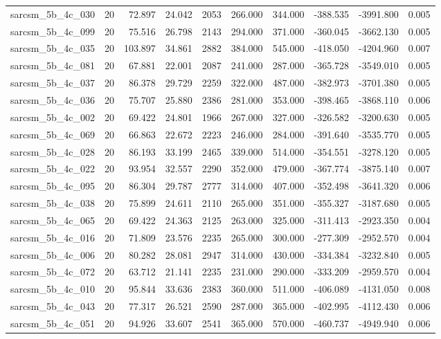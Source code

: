 \begin{tabular}{lrrrrrrrrr}
sarcsm\_5b\_4c\_030 & 20 & 72.897 & 24.042 & 2053 & 266.000 & 344.000 & -388.535 & -3991.800 & 0.005 \\
sarcsm\_5b\_4c\_099 & 20 & 75.516 & 26.798 & 2143 & 294.000 & 371.000 & -360.045 & -3662.130 & 0.005 \\
sarcsm\_5b\_4c\_035 & 20 & 103.897 & 34.861 & 2882 & 384.000 & 545.000 & -418.050 & -4204.960 & 0.007 \\
sarcsm\_5b\_4c\_081 & 20 & 67.881 & 22.001 & 2087 & 241.000 & 287.000 & -365.728 & -3549.010 & 0.005 \\
sarcsm\_5b\_4c\_037 & 20 & 86.378 & 29.729 & 2259 & 322.000 & 487.000 & -382.973 & -3701.380 & 0.005 \\
sarcsm\_5b\_4c\_036 & 20 & 75.707 & 25.880 & 2386 & 281.000 & 353.000 & -398.465 & -3868.110 & 0.006 \\
sarcsm\_5b\_4c\_002 & 20 & 69.422 & 24.801 & 1966 & 267.000 & 327.000 & -326.582 & -3200.630 & 0.005 \\
sarcsm\_5b\_4c\_069 & 20 & 66.863 & 22.672 & 2223 & 246.000 & 284.000 & -391.640 & -3535.770 & 0.005 \\
sarcsm\_5b\_4c\_028 & 20 & 86.193 & 33.199 & 2465 & 339.000 & 514.000 & -354.551 & -3278.120 & 0.005 \\
sarcsm\_5b\_4c\_022 & 20 & 93.954 & 32.557 & 2290 & 352.000 & 479.000 & -367.774 & -3875.140 & 0.007 \\
sarcsm\_5b\_4c\_095 & 20 & 86.304 & 29.787 & 2777 & 314.000 & 407.000 & -352.498 & -3641.320 & 0.006 \\
sarcsm\_5b\_4c\_038 & 20 & 75.899 & 24.611 & 2110 & 265.000 & 351.000 & -355.327 & -3187.680 & 0.005 \\
sarcsm\_5b\_4c\_065 & 20 & 69.422 & 24.363 & 2125 & 263.000 & 325.000 & -311.413 & -2923.350 & 0.004 \\
sarcsm\_5b\_4c\_016 & 20 & 71.809 & 23.576 & 2235 & 265.000 & 300.000 & -277.309 & -2952.570 & 0.004 \\
sarcsm\_5b\_4c\_006 & 20 & 80.282 & 28.081 & 2947 & 314.000 & 430.000 & -334.384 & -3232.840 & 0.005 \\
sarcsm\_5b\_4c\_072 & 20 & 63.712 & 21.141 & 2235 & 231.000 & 290.000 & -333.209 & -2959.570 & 0.004 \\
sarcsm\_5b\_4c\_010 & 20 & 95.844 & 33.636 & 2383 & 360.000 & 511.000 & -406.089 & -4131.050 & 0.008 \\
sarcsm\_5b\_4c\_043 & 20 & 77.317 & 26.521 & 2590 & 287.000 & 365.000 & -402.995 & -4112.430 & 0.006 \\
sarcsm\_5b\_4c\_051 & 20 & 94.926 & 33.607 & 2541 & 365.000 & 570.000 & -460.737 & -4949.940 & 0.006 \\

\end{tabular}

